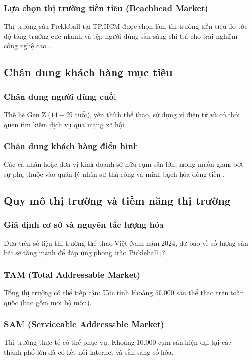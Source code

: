 \subsubsection{Lựa chọn thị trường tiền tiêu (Beachhead Market)}
Thị trường sân Pickleball tại TP.HCM được chọn làm thị trường tiền tiêu do tốc độ tăng trưởng cực nhanh và tệp người dùng sẵn sàng chi trả cho trải nghiệm công nghệ cao .


\subsection{Chân dung khách hàng mục tiêu}
\subsubsection{Chân dung người dùng cuối}
Thế hệ Gen Z ($14-29$ tuổi), yêu thích thể thao, sử dụng ví điện tử và có thói quen tìm kiếm dịch vụ qua mạng xã hội.

\subsubsection{Chân dung khách hàng điển hình}
Các cá nhân hoặc đơn vị kinh doanh sở hữu cụm sân lớn, mong muốn giảm bớt sự phụ thuộc vào quản lý nhân sự thủ công và minh bạch hóa dòng tiền .



\subsection{Quy mô thị trường và tiềm năng thị trường}
\subsubsection{Giả định cơ sở và nguyên tắc lượng hóa}
Dựa trên số liệu thị trường thể thao Việt Nam năm 2024, dự báo về số lượng sân bãi sẽ tăng mạnh để đáp ứng phong trào Pickleball [?].

\subsubsection{TAM (Total Addressable Market)}
Tổng thị trường có thể tiếp cận: Ước tính khoảng $50.000$ sân thể thao trên toàn quốc (bao gồm mọi bộ môn).

\subsubsection{SAM (Serviceable Addressable Market)}
Thị trường thực tế có thể phục vụ: Khoảng $10.000$ cụm sân hiện đại tại các thành phố lớn đã có kết nối Internet và sẵn sàng số hóa.

